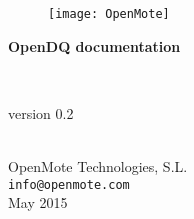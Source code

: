 \begin{center}
\begin{figure}[!h]
    \centering
	\texttt{[image: OpenMote]}
\end{figure}
\vspace*{7.5cm}
\begin{huge} \textbf{OpenDQ documentation} \end{huge} \bigskip \\ 
\begin{Large} version 0.2 \end{Large} \\
\vspace*{7.5cm}
OpenMote Technologies, S.L. \\
\texttt{info@openmote.com} \\
\bigskip
May 2015
\end{center}